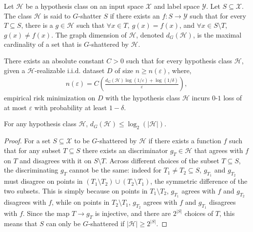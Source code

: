 \begin{definition} Let $\mathcal{H}$ be a hypothesis class on an input space $\mathcal{X}$ and label space $\mathcal{Y}$. Let $S \subseteq \mathcal{X}$. The class $\mathcal{H}$ is said to $G$-shatter $S$ if there exists an $f : S \to \mathcal{Y}$ such that for every $T \subseteq S$, there is a $g \in \mathcal{H}$ such that $\forall x \in T,\ g(x) = f (x)$, and $\forall x \in S \setminus T$, $g(x) \ne f (x)$. The graph dimension of $\mathcal{H}$, denoted $d_G (\mathcal{H})$, is the maximal cardinality of a set that is $G$-shattered by $\mathcal{H}$.
\end{definition}

\begin{theorem} \label{theorem:multiclass}
There exists an absolute constant $C > 0$ such that for every hypothesis class $\mathcal{H}$, given a $\mathcal{H}$-realizable i.i.d. dataset $D$ of size $n \ge n (\varepsilon)$, where,
\begin{align} \label{eq:nstar}
    n (\varepsilon) = C \left( \frac{d_G (\mathcal{H}) \log ( 1/\varepsilon ) + \log ( 1/\delta)}{\varepsilon} \right),
\end{align}
empirical risk minimization on $D$ with the hypothesis class $\mathcal{H}$ incurs $0$-$1$ loss of at most $\varepsilon$ with probability at least $1-\delta$.
\end{theorem}

\begin{lemma}
For any hypothesis class $\mathcal{H}$, $d_G (\mathcal{H}) \le \log_2 (|\mathcal{H}|)$.
\end{lemma}
\begin{proof}
For a set $S \subseteq \mathcal{X}$ to be $G$-shattered by $\mathcal{H}$ if there exists a function $f$ such that for any subset $T \subseteq S$ there exists an discriminator $g_T \in \mathcal{H}$ that agrees with $f$ on $T$ and disagrees with it on $S \setminus T$. Across different choices of the subset $T \subseteq S$, the discriminating $g_T$ cannot be the same: indeed for $T_1 \ne T_2 \subseteq S$, $g_{T_1}$ and $g_{T_2}$ must disagree on points in $(T_1 \setminus T_2) \cup (T_2 \setminus T_1)$, the symmetric difference of the two subsets. This is simply because on points in $T_1 \setminus T_2$, $g_{T_1}$ agrees with $f$ and $g_{T_2}$ disagrees with $f$, while on points in $T_2 \setminus T_1$, $g_{T_2}$ agrees with $f$ and $g_{T_1}$ disagrees with $f$. Since the map $T \to g_T$ is injective, and there are $2^{|S|}$ choices of $T$, this means that $S$ can only be $G$-shattered if $|\mathcal{H}| \ge 2^{|S|}$.
\end{proof}

